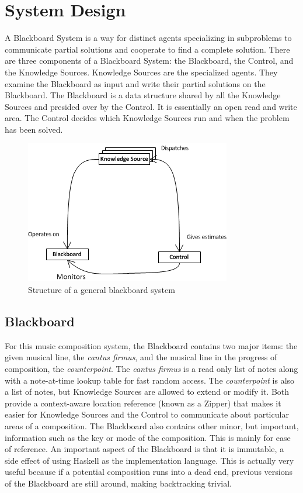 \section{System Design} %

A Blackboard System is a way for distinct agents specializing in subproblems to communicate partial solutions and cooperate to find a complete solution.
There are three components of a Blackboard System: the Blackboard, the Control, and the Knowledge Sources.
Knowledge Sources are the specialized agents. They examine the Blackboard as input and write their partial solutions on the Blackboard.
The Blackboard is a data structure shared by all the Knowledge Sources and presided over by the Control. It is essentially an open read and write area.
The Control decides which Knowledge Sources run and when the problem has been solved.

\begin{figure}[h]
\centering
	\includegraphics[keepaspectratio=true]{blackboard-system-diagram.png}
\caption{Structure of a general blackboard system}
\end{figure}

\subsection{Blackboard} %

For this music composition system, the Blackboard contains two major items: the given musical line, the \emph{cantus firmus}, and the musical line in the progress of composition, the \emph{counterpoint}.
The \emph{cantus firmus} is a read only list of notes along with a note-at-time lookup table for fast random access.
The \emph{counterpoint} is also a list of notes, but Knowledge Sources are allowed to extend or modify it.
Both provide a context-aware location reference (known as a Zipper) that makes it easier for Knowledge Sources and the Control to communicate about particular areas of a composition.
The Blackboard also contains other minor, but important, information such as the key or mode of the composition. This is mainly for ease of reference.
An important aspect of the Blackboard is that it is immutable, a side effect of using Haskell as the implementation language.
This is actually very useful because if a potential composition runs into a dead end, previous versions of the Blackboard are still around, making backtracking trivial.

